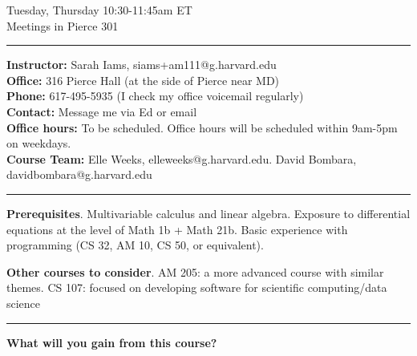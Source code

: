 \documentclass[12pt,letterpaper]{exam}
\begin{document}
\pdfpageheight 11in 
\pdfpagewidth 8.5in
\begin{center}
    Tuesday, Thursday 10:30-11:45am ET \\
    Meetings in Pierce 301 \\ 
\end{center}

\vspace{0.5cm}

\hrule
\vspace{0.5cm}

\noindent \textbf{Instructor:} Sarah Iams, siams+am111@g.harvard.edu \\
\textbf{Office:} 316 Pierce Hall (at the side of Pierce near MD) \\
\textbf{Phone:} 617-495-5935 (I check my office voicemail regularly) \\
\textbf{Contact:} Message me via Ed or email\\
\textbf{Office hours:} To be scheduled.  Office hours will be scheduled within 9am-5pm on weekdays.\\
\textbf{Course Team:} Elle Weeks, elleweeks@g.harvard.edu.  David Bombara, davidbombara@g.harvard.edu


\vspace{0.5cm}

\hrule
\vspace{0.5cm}

\noindent \textbf{Prerequisites}.  Multivariable calculus and linear algebra.  Exposure to differential equations at the level of Math 1b + Math 21b.  Basic experience with programming (CS 32, AM 10, CS 50, or equivalent).
\vspace{0.1cm}




\noindent \textbf{Other courses to consider}. AM 205: a more advanced course with similar themes.  CS 107: focused on developing software for scientific computing/data science


\vspace{0.5cm}

\hrule
\vspace{0.5cm}

\noindent \textbf{What will you gain from this course?}
\end{document}
